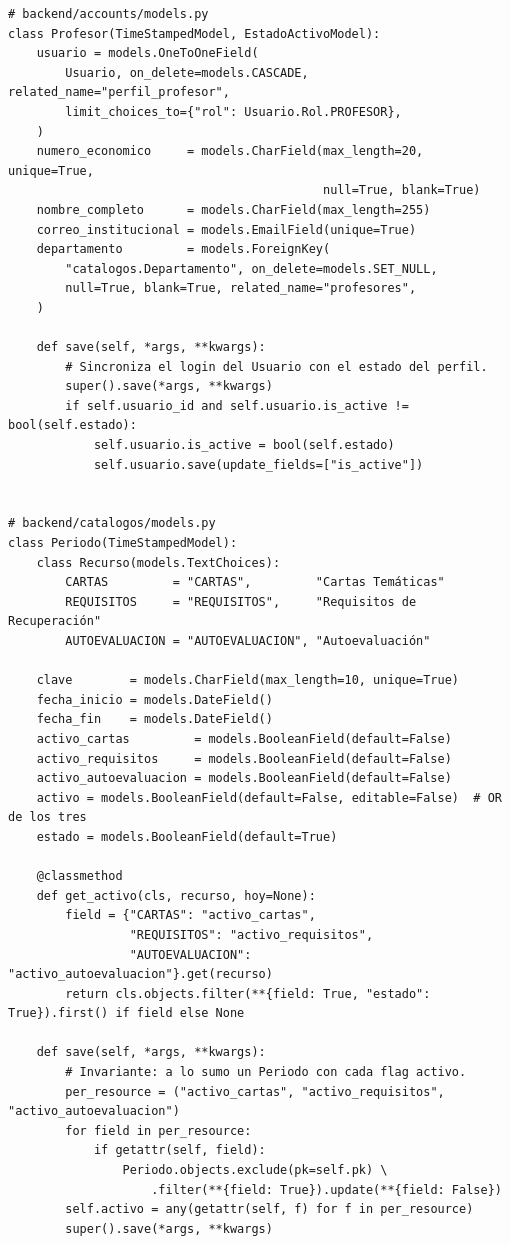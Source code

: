 \begin{Verbatim}[fontsize=\small, frame=single]
# backend/accounts/models.py
class Profesor(TimeStampedModel, EstadoActivoModel):
    usuario = models.OneToOneField(
        Usuario, on_delete=models.CASCADE, related_name="perfil_profesor",
        limit_choices_to={"rol": Usuario.Rol.PROFESOR},
    )
    numero_economico     = models.CharField(max_length=20, unique=True,
                                            null=True, blank=True)
    nombre_completo      = models.CharField(max_length=255)
    correo_institucional = models.EmailField(unique=True)
    departamento         = models.ForeignKey(
        "catalogos.Departamento", on_delete=models.SET_NULL,
        null=True, blank=True, related_name="profesores",
    )

    def save(self, *args, **kwargs):
        # Sincroniza el login del Usuario con el estado del perfil.
        super().save(*args, **kwargs)
        if self.usuario_id and self.usuario.is_active != bool(self.estado):
            self.usuario.is_active = bool(self.estado)
            self.usuario.save(update_fields=["is_active"])


# backend/catalogos/models.py
class Periodo(TimeStampedModel):
    class Recurso(models.TextChoices):
        CARTAS         = "CARTAS",         "Cartas Temáticas"
        REQUISITOS     = "REQUISITOS",     "Requisitos de Recuperación"
        AUTOEVALUACION = "AUTOEVALUACION", "Autoevaluación"

    clave        = models.CharField(max_length=10, unique=True)
    fecha_inicio = models.DateField()
    fecha_fin    = models.DateField()
    activo_cartas         = models.BooleanField(default=False)
    activo_requisitos     = models.BooleanField(default=False)
    activo_autoevaluacion = models.BooleanField(default=False)
    activo = models.BooleanField(default=False, editable=False)  # OR de los tres
    estado = models.BooleanField(default=True)

    @classmethod
    def get_activo(cls, recurso, hoy=None):
        field = {"CARTAS": "activo_cartas",
                 "REQUISITOS": "activo_requisitos",
                 "AUTOEVALUACION": "activo_autoevaluacion"}.get(recurso)
        return cls.objects.filter(**{field: True, "estado": True}).first() if field else None

    def save(self, *args, **kwargs):
        # Invariante: a lo sumo un Periodo con cada flag activo.
        per_resource = ("activo_cartas", "activo_requisitos", "activo_autoevaluacion")
        for field in per_resource:
            if getattr(self, field):
                Periodo.objects.exclude(pk=self.pk) \
                    .filter(**{field: True}).update(**{field: False})
        self.activo = any(getattr(self, f) for f in per_resource)
        super().save(*args, **kwargs)
\end{Verbatim}

